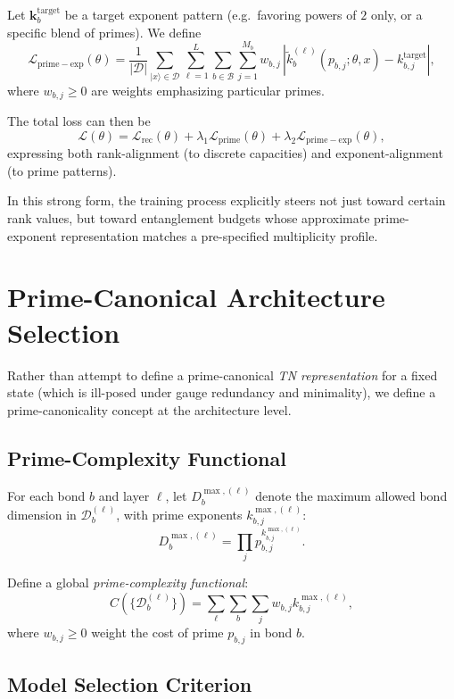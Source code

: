 \documentclass[11pt]{article}
\begin{document}
Let $\mathbf{k}_b^{\mathrm{target}}$ be a target exponent pattern (e.g.\ favoring powers of $2$ only, or a specific blend of primes). We define
\[
\mathcal{L}_{\mathrm{prime-exp}}(\theta)
= \frac{1}{|\mathcal{D}|}
\sum_{\lvert x \rangle\in \mathcal{D}}
\sum_{\ell=1}^L
\sum_{b\in\mathcal{B}}
\sum_{j=1}^{M_b}
w_{b,j}\,
\left|\tilde{k}_b^{(\ell)}(p_{b,j};\theta,x)
- k_{b,j}^{\mathrm{target}}\right|,
\]
where $w_{b,j}\ge 0$ are weights emphasizing particular primes.

The total loss can then be
\[
\mathcal{L}(\theta)
= \mathcal{L}_{\mathrm{rec}}(\theta)
+ \lambda_1 \mathcal{L}_{\mathrm{prime}}(\theta)
+ \lambda_2 \mathcal{L}_{\mathrm{prime-exp}}(\theta),
\]
expressing both rank-alignment (to discrete capacities) and exponent-alignment (to prime patterns).

In this strong form, the training process explicitly steers not just toward certain rank values, but toward entanglement budgets whose approximate prime-exponent representation matches a pre-specified multiplicity profile.

\section{Prime-Canonical Architecture Selection}

Rather than attempt to define a prime-canonical \emph{TN representation} for a fixed state (which is ill-posed under gauge redundancy and minimality), we define a prime-canonicality concept at the architecture level.

\subsection{Prime-Complexity Functional}

For each bond $b$ and layer $\ell$, let $D_b^{\max,(\ell)}$ denote the maximum allowed bond dimension in $\mathcal{D}_b^{(\ell)}$, with prime exponents $k_{b,j}^{\max,(\ell)}$:
\[
D_b^{\max,(\ell)} = \prod_{j} p_{b,j}^{k_{b,j}^{\max,(\ell)}}.
\]

Define a global \emph{prime-complexity functional}:
\[
C(\{\mathcal{D}_b^{(\ell)}\})
= \sum_{\ell} \sum_{b}
\sum_{j} w_{b,j} k_{b,j}^{\max,(\ell)},
\]
where $w_{b,j}\ge 0$ weight the cost of prime $p_{b,j}$ in bond $b$.

\subsection{Model Selection Criterion}
\end{document}
